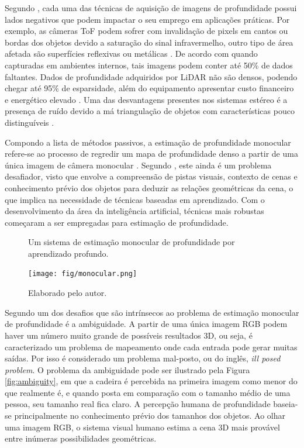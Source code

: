 Segundo \cite{castellano2023performance}, cada uma das técnicas de aquisição de imagens de profundidade possui lados negativos que podem impactar o seu emprego em aplicações práticas. Por exemplo, as câmeras ToF  podem sofrer com invalidação de pixels em cantos ou bordas dos objetos devido a saturação do sinal infravermelho, outro tipo de área afetada são superfícies reflexivas ou metálicas \cite{zollhofer2019commodity}. De acordo com  quando capturadas em ambientes internos, tais imagens podem conter até 50\% de dados faltantes. Dados de profundidade adquiridos por LiDAR não são densos, podendo chegar até 95\% de esparsidade, além do equipamento apresentar custo financeiro e energético elevado \cite{khan2020deep} \cite{hu2022deep}. Uma das desvantagens presentes nos sistemas estéreo é a presença de ruído devido a má triangulação de objetos com características pouco distinguíveis \cite{castellano2023performance}.


Compondo a lista de métodos passivos, a estimação de profundidade monocular refere-se ao processo de regredir um mapa de profundidade denso a partir de uma única imagem de câmera monocular \cite{birkl2023midas}. Segundo , este ainda é um problema desafiador, visto que envolve a compreensão de pistas visuais, contexto de cenas e conhecimento prévio dos objetos para deduzir as relações geométricas da cena, o que implica na necessidade de técnicas baseadas em aprendizado. Com o desenvolvimento da área da inteligência artificial, técnicas mais robustas começaram a ser empregadas para estimação de profundidade. 

\begin{figure}[h!]
    \centering
    \caption{Um sistema de estimação monocular de profundidade por aprendizado profundo.}
    \texttt{[image: fig/monocular.png]}
    \caption*{Elaborado pelo autor.}
    \label{fig:monoestim}
\end{figure}

Segundo  um dos desafios que são intrínsecos ao problema de estimação monocular de profundidade é a ambiguidade. A partir de uma única imagem RGB podem haver um número muito grande de possíveis resultados 3D, ou seja, é caracterizado um problema de mapeamento onde cada entrada pode gerar muitas saídas. Por isso é considerado um problema mal-posto, ou do inglês, \textit{ill posed problem}. O problema da ambiguidade pode ser ilustrado pela Figura \ref{fig:ambiguity}, em que a cadeira é percebida na primeira imagem como menor do que realmente é, e quando posta em comparação com o tamanho médio de uma pessoa, seu tamanho real fica claro. A percepção humana de profundidade baseia-se principalmente no conhecimento prévio dos tamanhos dos objetos. Ao olhar uma imagem RGB, o sistema visual humano estima a cena 3D mais provável entre inúmeras possibilidades geométricas. 


